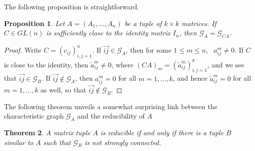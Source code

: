 \documentclass[draft, 12pt, reqno]{amsart}
\numberwithin{equation}{section}
\theoremstyle{plain}
\newtheorem{theorem}{Theorem}[section]
\newtheorem{proposition}[theorem]{Proposition}
\begin{document}
The following proposition is straightforward.

\begin{proposition}\label{transform invariant}
Let $A=(A_1, ..., A_n)$ be a tuple of $k\times k$ matrices. If $C\in GL(n)$ is sufficiently close to the identity matrix $I_n$, then $\mathcal{G}_{A}=\mathcal{G}_{CA}$.
\end{proposition}
\begin{proof} Write $C=(c_{ij})_{i,j=1}^n$. If $\overrightarrow{ij}\in \mathcal{G}_{A}$, then for some $1\leq m\leq n$, \ $a^m_{ij} \neq 0$. If $C$ is close to the identity, then $\widetilde{a}^m_{ij}\neq 0$, where $(CA)_m=(\widetilde{a}^m_{ij})_{i,j=1}^k$, and we see that $\overrightarrow{ij} \in \mathcal{G}_B$. 
If $\overrightarrow{ij}\notin \mathcal{G}_A$, then $a_{ij}^m=0$ for all $m=1,...,k$, and hence $\widetilde{a}_{ij}^m=0$ for all $m=1,...,k$ as well, so that $\overrightarrow{ij}\notin \mathcal{G}_B$.
\end{proof}


The following theorem unveils a somewhat surprising link between the characteristic graph $\mathcal{G}_A$ and the reducibility of $A$

\begin{theorem}\label{not connected}
A matrix tuple $A$ is reducible if and only if there is a tuple $B$ similar to $A$ such that $\mathcal{G}_B$ is not strongly connected.
\end{theorem}
\end{document}
